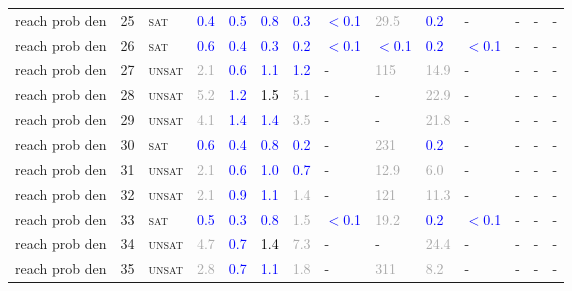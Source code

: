 \begin{center}
{\begin{longtable}{@{}llllllllllllll@{}}
reach prob den & 25 & \textsc{sat} & \textcolor{blue}{0.4} & \textcolor{blue}{0.5} & \textcolor{blue}{0.8} & \textcolor{blue}{0.3} & \textcolor{blue}{$<$0.1} & \textcolor{darkgray}{29.5} & \textcolor{blue}{0.2} & - & - & - & - \\
reach prob den & 26 & \textsc{sat} & \textcolor{blue}{0.6} & \textcolor{blue}{0.4} & \textcolor{blue}{0.3} & \textcolor{blue}{0.2} & \textcolor{blue}{$<$0.1} & \textcolor{blue}{$<$0.1} & \textcolor{blue}{0.2} & \textcolor{blue}{$<$0.1} & - & - & - \\
reach prob den & 27 & \textsc{unsat} & \textcolor{darkgray}{2.1} & \textcolor{blue}{0.6} & \textcolor{blue}{1.1} & \textcolor{blue}{1.2} & - & \textcolor{darkgray}{115} & \textcolor{darkgray}{14.9} & - & - & - & - \\
reach prob den & 28 & \textsc{unsat} & \textcolor{darkgray}{5.2} & \textcolor{blue}{1.2} & \textcolor{black}{1.5} & \textcolor{darkgray}{5.1} & - & - & \textcolor{darkgray}{22.9} & - & - & - & - \\
reach prob den & 29 & \textsc{unsat} & \textcolor{darkgray}{4.1} & \textcolor{blue}{1.4} & \textcolor{blue}{1.4} & \textcolor{darkgray}{3.5} & - & - & \textcolor{darkgray}{21.8} & - & - & - & - \\
reach prob den & 30 & \textsc{sat} & \textcolor{blue}{0.6} & \textcolor{blue}{0.4} & \textcolor{blue}{0.8} & \textcolor{blue}{0.2} & - & \textcolor{darkgray}{231} & \textcolor{blue}{0.2} & - & - & - & - \\
reach prob den & 31 & \textsc{unsat} & \textcolor{darkgray}{2.1} & \textcolor{blue}{0.6} & \textcolor{blue}{1.0} & \textcolor{blue}{0.7} & - & \textcolor{darkgray}{12.9} & \textcolor{darkgray}{6.0} & - & - & - & - \\
reach prob den & 32 & \textsc{unsat} & \textcolor{darkgray}{2.1} & \textcolor{blue}{0.9} & \textcolor{blue}{1.1} & \textcolor{darkgray}{1.4} & - & \textcolor{darkgray}{121} & \textcolor{darkgray}{11.3} & - & - & - & - \\
reach prob den & 33 & \textsc{sat} & \textcolor{blue}{0.5} & \textcolor{blue}{0.3} & \textcolor{blue}{0.8} & \textcolor{darkgray}{1.5} & \textcolor{blue}{$<$0.1} & \textcolor{darkgray}{19.2} & \textcolor{blue}{0.2} & \textcolor{blue}{$<$0.1} & - & - & - \\
reach prob den & 34 & \textsc{unsat} & \textcolor{darkgray}{4.7} & \textcolor{blue}{0.7} & \textcolor{black}{1.4} & \textcolor{darkgray}{7.3} & - & - & \textcolor{darkgray}{24.4} & - & - & - & - \\
reach prob den & 35 & \textsc{unsat} & \textcolor{darkgray}{2.8} & \textcolor{blue}{0.7} & \textcolor{blue}{1.1} & \textcolor{darkgray}{1.8} & - & \textcolor{darkgray}{311} & \textcolor{darkgray}{8.2} & - & - & - & - \\

\end{longtable}}
\end{center}
